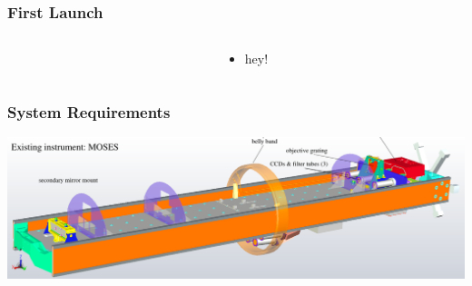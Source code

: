 \documentclass[landscape,xcolor={table}]{beamer}
\begin{document}
	\begin{frame}
		
		\frametitle{First Launch}
		
		\begin{columns}[T] %
		\begin{column}{.20\textwidth}

			
		\end{column}%
		\hfill%
		\begin{column}{.78\textwidth}
		
			\begin{itemize}
				\item hey!
			\end{itemize}
		
		\end{column}%
		\end{columns}
	
	\end{frame}
		
	\begin{frame}
	
		\frametitle{System Requirements}
		
		\includegraphics[width=\textwidth]{images/moses}

	\end{frame}
	
\end{document}
